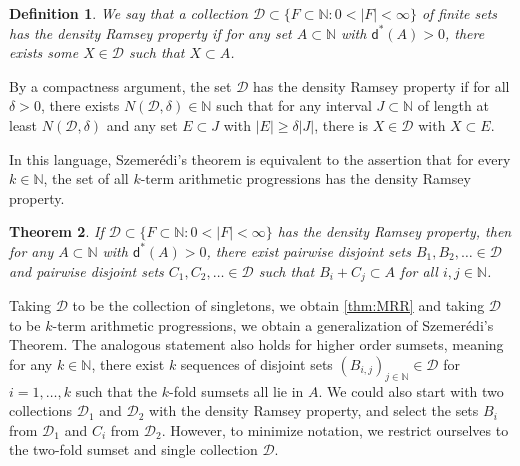 \documentclass[10pt,dvipsnames]{article}
\newtheorem{theorem}{Theorem}[section]
\newtheorem{definition}[theorem]{Definition}
\theoremstyle{definition}
\theoremstyle{plain}
\newcommand{\define}[1]{\textit{#1}}
\newcommand{\N}{\mathbb{N}}
\newcommand{\CD}{\mathcal{D}}
\newcommand{\ubdens}{\mathsf{d}^*}
\newcommand{\Szemeredi}{Szemer\'{e}di}
\begin{document}
\begin{definition}
We say that a collection $\CD \subset\{F\subset\N\colon 0 < |F|< \infty\}$ of finite sets has the \define{density Ramsey property} if for any set $A\subset \N$ with $\ubdens(A)> 0$, there exists some $X\in\CD$ such that $X\subset A$.
\end{definition}

By a compactness argument, the set $\CD$ 
has the density Ramsey property  if for all $\delta > 0$, there exists 
$N(\CD, \delta)\in\N$ such that for any interval $J\subset\N$ of length at least $N(\CD, \delta)$ and any set $E\subset J$ with $|E|\geq \delta |J|$, there is $X\in\CD$ with $X\subset E$.

In this language, \Szemeredi{}'s theorem is equivalent to the assertion that for every $k \in \N$, the set of all $k$-term arithmetic progressions has the density Ramsey property.

\begin{theorem}
\label{thm_sumset_szemeredi}
If $\CD\subset\{F\subset\N\colon 0 < |F|< \infty\}$ has the density Ramsey property, then for any $A\subset \N$ with $\ubdens(A)> 0$, there exist pairwise disjoint sets 
$B_1, B_2, \ldots\in\CD$ and pairwise disjoint sets $C_1, C_2, \ldots\in\CD$ such that $B_i+C_j\subset A$ for all $i,j\in\N$.  
\end{theorem}

Taking $\CD$ to be the collection of singletons, we obtain \cref{thm:MRR} and taking $\CD$ to be $k$-term arithmetic progressions, we obtain a generalization of \Szemeredi{}'s Theorem. 
The analogous statement also holds for higher order sumsets, meaning for any $k\in\N$, there exist $k$ sequences of disjoint sets $(B_{i,j})_{j\in\N}\in\CD$ for $i=1, \dots, k$ such that the $k$-fold sumsets all lie in $A$. We could also start with two collections $\CD_1$ and $\CD_2$ with the density Ramsey property, and select the sets $B_i$ from $\CD_1$ and $C_i$ from $\CD_2$.  However, to minimize notation, we restrict ourselves to the two-fold sumset and single collection $\CD$.
\end{document}
